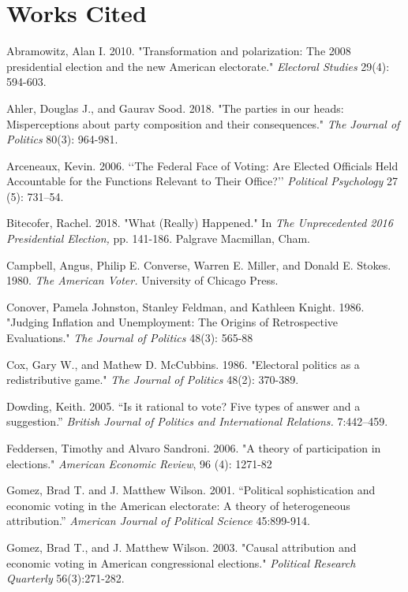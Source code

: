 \documentclass[12pt]{paper}
\begin{document}
\section*{Works Cited}
\singlespace 
\begin{hangparas}{.25in}{1}

Abramowitz, Alan I. 2010. "Transformation and polarization: The 2008 presidential election and the new American electorate." \textit{Electoral Studies} 29(4): 594-603.

Ahler, Douglas J., and Gaurav Sood. 2018. "The parties in our heads: Misperceptions about party composition and their consequences." \textit{The Journal of Politics} 80(3): 964-981.

Arceneaux, Kevin. 2006. ‘‘The Federal Face of Voting: Are Elected Officials Held Accountable for the Functions Relevant to Their Office?’’ \textit{Political Psychology} 27 (5): 731–54.

Bitecofer, Rachel. 2018. "What (Really) Happened." In \textit{The Unprecedented 2016 Presidential Election,} pp. 141-186. Palgrave Macmillan, Cham.

Campbell, Angus, Philip E. Converse, Warren E. Miller, and Donald E. Stokes. 1980. \textit{The American Voter.} University of Chicago Press.

Conover, Pamela Johnston, Stanley Feldman, and Kathleen Knight. 1986. "Judging Inflation and Unemployment: The Origins of Retrospective Evaluations." \textit{The Journal of Politics} 48(3): 565-88

Cox, Gary W., and Mathew D. McCubbins. 1986. "Electoral politics as a redistributive game." \textit{The Journal of Politics} 48(2): 370-389.

Dowding, Keith. 2005. “Is it rational to vote? Five types of answer and a suggestion.” \textit{British Journal of Politics and International Relations.} 7:442–459.

Feddersen, Timothy and Alvaro Sandroni. 2006. "A theory of participation in elections." \textit{American Economic Review}, 96 (4): 1271-82

Gomez, Brad T. and J. Matthew Wilson. 2001. “Political sophistication and economic voting in the American electorate: A theory of heterogeneous attribution.” \textit{American Journal of Political Science} 45:899-914.

Gomez, Brad T., and J. Matthew Wilson. 2003. "Causal attribution and economic voting in American congressional elections." \textit{Political Research Quarterly} 56(3):271-282.


\end{hangparas}
\end{document}
